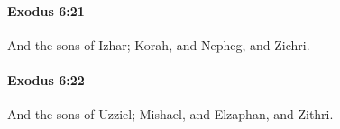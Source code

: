 		\paragraph{Exodus 6:21} %
			\label{EXODUS-6-21}

			And the sons of Izhar; Korah, and Nepheg, and Zichri.


		\paragraph{Exodus 6:22} %
			\label{EXODUS-6-22}

			And the sons of Uzziel; Mishael, and Elzaphan, and Zithri.


